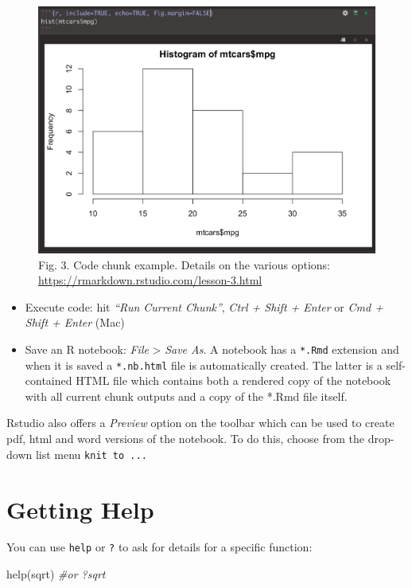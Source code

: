 \documentclass[
]{book}
\newenvironment{Shaded}{\begin{snugshade}}{\end{snugshade}}
\newcommand{\CommentTok}[1]{\textcolor[rgb]{0.56,0.35,0.01}{\textit{#1}}}
\newcommand{\FunctionTok}[1]{\textcolor[rgb]{0.00,0.00,0.00}{#1}}
\newcommand{\NormalTok}[1]{#1}
\begin{document}
\begin{figure}
\centering
\includegraphics{figs/ch2/codechunk.png}
\caption{Fig. 3. Code chunk example. Details on the various options: \url{https://rmarkdown.rstudio.com/lesson-3.html}}
\end{figure}

\begin{itemize}
\item
  Execute code: hit \emph{``Run Current Chunk''}, \emph{Ctrl + Shift + Enter} or \emph{Cmd + Shift + Enter} (Mac)
\item
  Save an R notebook: \emph{File} \textgreater{} \emph{Save As}. A notebook has a \texttt{*.Rmd} extension and when it is saved a \texttt{*.nb.html} file is automatically created. The latter is a self-contained HTML file which contains both a rendered copy of the notebook with all current chunk outputs and a copy of the *.Rmd file itself.
\end{itemize}

Rstudio also offers a \emph{Preview} option on the toolbar which can be used to create pdf, html and word versions of the notebook. To do this, choose from the drop-down list menu \texttt{knit\ to\ ...}

\hypertarget{getting-help}{%
\section{Getting Help}\label{getting-help}}

You can use \texttt{help} or \texttt{?} to ask for details for a specific function:

\begin{Shaded}
\begin{Highlighting}[]
\FunctionTok{help}\NormalTok{(sqrt) }\CommentTok{\#or ?sqrt}
\end{Highlighting}
\end{Shaded}
\end{document}
